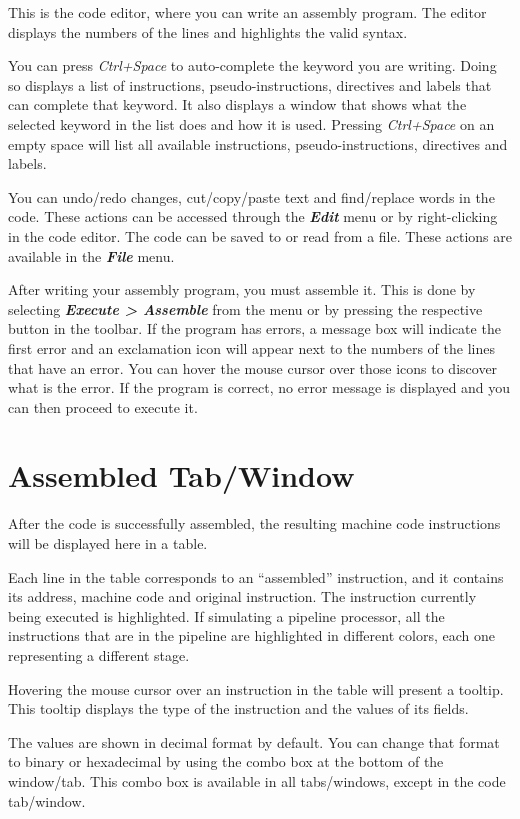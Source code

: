 \documentclass[11pt,a4paper,twoside,titlepage]{article}
\newcommand{\menupath}[1]{\textbf{\emph{#1}}}
\begin{document}
This is the code editor, where you can write an assembly program.
The editor displays the numbers of the lines and highlights the valid syntax.

You can press \emph{Ctrl+Space} to auto-complete the keyword you are writing.
Doing so displays a list of instructions, pseudo-instructions, directives and
labels that can complete that keyword.
It also displays a window that shows what the selected keyword in the list does
and how it is used.
Pressing \emph{Ctrl+Space} on an empty space will list all available
instructions, pseudo-instructions, directives and labels.

You can undo/redo changes, cut/copy/paste text and find/replace words in the
code. These actions can be accessed through the \menupath{Edit} menu or by
right-clicking in the code editor.
The code can be saved to or read from a file. These actions are available in
the \menupath{File} menu.

After writing your assembly program, you must assemble it.
This is done by selecting \menupath{Execute > Assemble} from the menu or by
pressing the respective button in the toolbar.
If the program has errors, a message box will indicate the first error and an
exclamation icon will appear next to the numbers of the lines that have an
error.
You can hover the mouse cursor over those icons to discover what is the error.
If the program is correct, no error message is displayed and you can then
proceed to execute it.


\section{Assembled Tab/Window}

After the code is successfully assembled, the resulting machine code 
instructions will be displayed here in a table.

Each line in the table corresponds to an ``assembled'' instruction, and it
contains its address, machine code and original instruction.
The instruction currently being executed is highlighted.
If simulating a pipeline processor, all the instructions that are in the
pipeline are highlighted in different colors, each one representing a
different stage.

Hovering the mouse cursor over an instruction in the table will present a
tooltip. This tooltip displays the type of the instruction and the values
of its fields.

The values are shown in decimal format by default.
You can change that format to binary or hexadecimal by using the combo box
at the bottom of the window/tab.
This combo box is available in all tabs/windows, except in the code tab/window.
\end{document}
